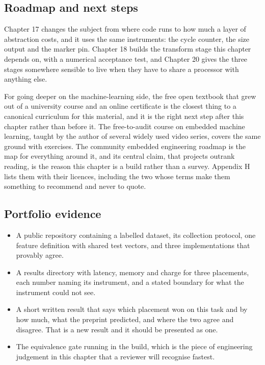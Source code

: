 \subsection*{Roadmap and next steps}

Chapter 17 changes the subject from where code runs to how much a layer of
abstraction costs, and it uses the same instruments: the cycle counter, the size
output and the marker pin. Chapter 18 builds the transform stage this chapter
depends on, with a numerical acceptance test, and Chapter 20 gives the three
stages somewhere sensible to live when they have to share a processor with
anything else.

For going deeper on the machine-learning side, the free open textbook that grew
out of a university course and an online certificate is the closest thing to a
canonical curriculum for this material, and it is the right next step after this
chapter rather than before it. The free-to-audit course on embedded machine
learning, taught by the author of several widely used video series, covers the
same ground with exercises. The community embedded engineering roadmap is the
map for everything around it, and its central claim, that projects outrank
reading, is the reason this chapter is a build rather than a survey. Appendix H
lists them with their licences, including the two whose terms make them
something to recommend and never to quote.

\subsection*{Portfolio evidence}

\begin{itemize}
\item A public repository containing a labelled dataset, its collection
protocol, one feature definition with shared test vectors, and three
implementations that provably agree.
\item A results directory with latency, memory and charge for three placements,
each number naming its instrument, and a stated boundary for what the instrument
could not see.
\item A short written result that says which placement won on this task and by
how much, what the preprint predicted, and where the two agree and disagree.
That is a new result and it should be presented as one.
\item The equivalence gate running in the build, which is the piece of
engineering judgement in this chapter that a reviewer will recognise fastest.
\end{itemize}

